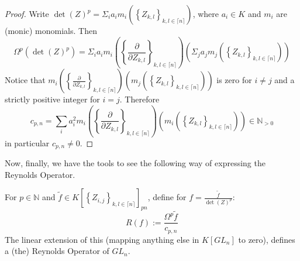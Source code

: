 \begin{proof}
  Write $ \operatorname{det} (Z)^p = \Sigma_i a_i m_i \left( \left\{ Z_{k,l} \right\}_{k,l \in \lceil n \rceil} \right) $, where $a_i \in K$ and $m_i$ are (monic) monomials.
  Then
  \begin{equation}
    \Omega^p \left( \operatorname{det} (Z)^p \right)
    = \Sigma_i a_i m_i \left( \left\{ \frac{\partial}{\partial Z_{k,l}} \right\}_{k,l \in \lceil n \rceil} \right) \left( \Sigma_j a_j m_j \left( \left\{ Z_{k,l} \right\}_{k,l \in \lceil n \rceil} \right) \right)
\end{equation}
Notice that $ m_i \left( \left\{ \frac{\partial}{\partial Z_{k,l}} \right\}_{k,l \in \lceil n \rceil} \right) \left( m_j \left( \left\{ Z_{k,l} \right\}_{k,l \in \lceil n \rceil} \right) \right) $ is zero for $ i \neq j $ and a strictly positive integer for $ i = j $. Therefore
\begin{equation}
  c_{p,n}
  = \sum_i a_i^2 m_i \left( \left\{ \frac{\partial}{\partial Z_{k,l}} \right\}_{k,l \in \lceil n \rceil} \right) \left( m_i \left( \left\{ Z_{k,l} \right\}_{k,l \in \lceil n \rceil} \right) \right) \in \mathbb{N}_{>0}
\end{equation}
in particular $c_{p,n} \neq 0$.
\end{proof}
Now, finally, we have the tools to see the following way of expressing the Reynolds Operator.
\begin{theorem}
  For $ p \in \mathbb{N} $ and $ \tilde{f} \in K \left\lbrack \left\{ Z_{i,j} \right\}_{k,l \in \lceil n \rceil} \right\rbrack_{pn} $, define for $ f = \frac{\tilde{f}}{\operatorname{det}(Z)^p}$:
  \begin{equation}
    R \left( f \right) := \frac{\Omega^p \tilde{f}}{c_{p,n}}
  \end{equation}
  The linear extension of this (mapping anything else in $K \left\lbrack GL_n \right\rbrack$ to zero), defines a (the) Reynolds Operator of $GL_n$.
\end{theorem}

